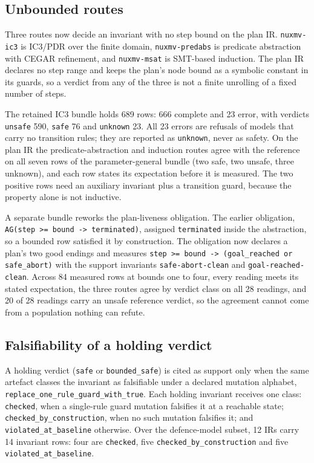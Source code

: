 \documentclass[11pt]{article}
\begin{document}
\subsection{Unbounded routes}
Three routes now decide an invariant with no step bound on the plan IR.
\texttt{nuxmv-ic3} is IC3/PDR over the finite domain, \texttt{nuxmv-predabs} is
predicate abstraction with CEGAR refinement, and \texttt{nuxmv-msat} is
SMT-based induction. The plan IR declares no step range and keeps the plan's
node bound as a symbolic constant in its guards, so a verdict from any of the
three is not a finite unrolling of a fixed number of steps.

The retained IC3 bundle holds 689 rows: 666 complete and 23 error, with verdicts
\texttt{unsafe} 590, \texttt{safe} 76 and \texttt{unknown} 23. All 23 errors are
refusals of models that carry no transition rules; they are reported as
\texttt{unknown}, never as safety. On the plan IR the predicate-abstraction and
induction routes agree with the reference on all seven rows of the
parameter-general bundle (two safe, two unsafe, three unknown), and each row
states its expectation before it is measured. The two positive rows need an
auxiliary invariant plus a transition guard, because the property alone is not
inductive.

A separate bundle reworks the plan-liveness obligation. The earlier obligation,
\texttt{AG(step >= bound -> terminated)}, assigned \texttt{terminated} inside the
abstraction, so a bounded row satisfied it by construction. The obligation now
declares a plan's two good endings and measures \texttt{step >= bound ->
(goal\_reached or safe\_abort)} with the support invariants \texttt{safe-abort-clean}
and \texttt{goal-reached-clean}. Across 84 measured rows at bounds one to four,
every reading meets its stated expectation, the three routes agree by verdict
class on all 28 readings, and 20 of 28 readings carry an unsafe reference
verdict, so the agreement cannot come from a population nothing can refute.

\subsection{Falsifiability of a holding verdict}
A holding verdict (\texttt{safe} or \texttt{bounded\_safe}) is cited as support
only when the same artefact classes the invariant as falsifiable under a declared
mutation alphabet, \texttt{replace\_one\_rule\_guard\_with\_true}. Each holding
invariant receives one class: \texttt{checked}, when a single-rule guard mutation
falsifies it at a reachable state; \texttt{checked\_by\_construction}, when no
such mutation falsifies it; and \texttt{violated\_at\_baseline} otherwise. Over
the defence-model subset, 12 IRs carry 14 invariant rows: four are
\texttt{checked}, five \texttt{checked\_by\_construction} and five
\texttt{violated\_at\_baseline}.
\end{document}
